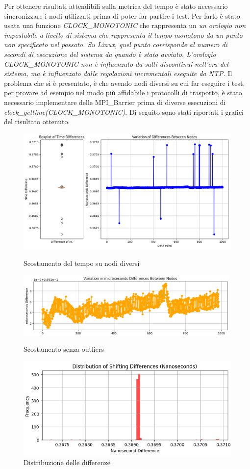 Per ottenere risultati attendibili sulla metrica del tempo è stato necessario sincronizzare i nodi utilizzati prima di poter far partire i test. Per farlo è stato usata una funzione \emph{CLOCK\_MONOTONIC} che rappresenta un \textit{un orologio non impostabile a livello di sistema che rappresenta il tempo monotono da un punto non specificato nel passato. Su Linux, quel punto corrisponde al numero di secondi di esecuzione del sistema da quando è stato avviato. L'orologio CLOCK\_MONOTONIC non è influenzato da salti discontinui nell'ora del sistema, ma è influenzato dalle regolazioni incrementali eseguite da  NTP.} Il problema che si è presentato, è che avendo nodi diversi su cui far eseguire i test, per provare ad esempio nel modo più affidabile i protocolli di trasporto, è stato necessario implementare delle MPI\_Barrier prima di diverse esecuzioni di \emph{clock\_gettime(CLOCK\_MONOTONIC)}. Di seguito sono stati riportati i grafici del risultato ottenuto.
\begin{figure}[H]
    \centering
    \includegraphics[width=\textwidth]{./results/time_sync_node.png}
    \caption{Scostamento del tempo su nodi diversi}
    \label{fig:sync_time_shift}
    \includegraphics[width=0.99\textwidth]{./results/time_shift_clean.png}
    \caption{Scostamento senza outliers}
    \label{fig:sync_diff_distr}
    \includegraphics[width=\textwidth]{./results/time_sync_distribution.png}
    \caption{Distribuzione delle differenze}
    \label{fig:sync_diff_distr}
\end{figure}

